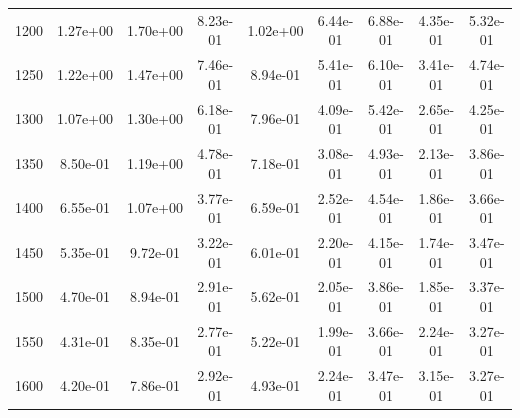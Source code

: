\begin{table}[h!]
{\begin{tabular}{|c|c|c|c|c|c|c|c|c|}
1200 & 1.27e+00 & 1.70e+00 & 8.23e-01 & 1.02e+00 & 6.44e-01 & 6.88e-01 & 4.35e-01 & 5.32e-01\\
1250 & 1.22e+00 & 1.47e+00 & 7.46e-01 & 8.94e-01 & 5.41e-01 & 6.10e-01 & 3.41e-01 & 4.74e-01\\
1300 & 1.07e+00 & 1.30e+00 & 6.18e-01 & 7.96e-01 & 4.09e-01 & 5.42e-01 & 2.65e-01 & 4.25e-01\\
1350 & 8.50e-01 & 1.19e+00 & 4.78e-01 & 7.18e-01 & 3.08e-01 & 4.93e-01 & 2.13e-01 & 3.86e-01\\
1400 & 6.55e-01 & 1.07e+00 & 3.77e-01 & 6.59e-01 & 2.52e-01 & 4.54e-01 & 1.86e-01 & 3.66e-01\\
1450 & 5.35e-01 & 9.72e-01 & 3.22e-01 & 6.01e-01 & 2.20e-01 & 4.15e-01 & 1.74e-01 & 3.47e-01\\
1500 & 4.70e-01 & 8.94e-01 & 2.91e-01 & 5.62e-01 & 2.05e-01 & 3.86e-01 & 1.85e-01 & 3.37e-01\\
1550 & 4.31e-01 & 8.35e-01 & 2.77e-01 & 5.22e-01 & 1.99e-01 & 3.66e-01 & 2.24e-01 & 3.27e-01\\
1600 & 4.20e-01 & 7.86e-01 & 2.92e-01 & 4.93e-01 & 2.24e-01 & 3.47e-01 & 3.15e-01 & 3.27e-01\\
      \hline
    \end{tabular}}
\end{table}

